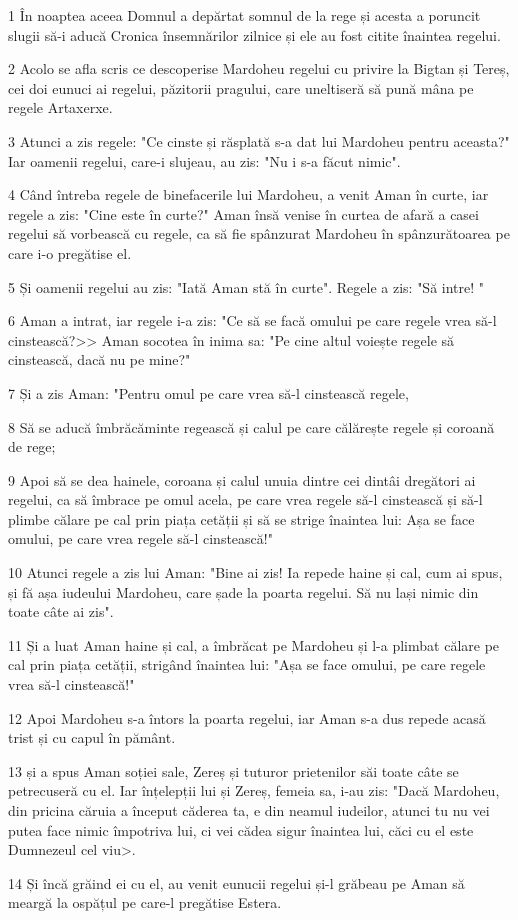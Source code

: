 \par 1 În noaptea aceea Domnul a depărtat somnul de la rege și acesta a poruncit slugii să-i aducă Cronica însemnărilor zilnice și ele au fost citite înaintea regelui.
\par 2 Acolo se afla scris ce descoperise Mardoheu regelui cu privire la Bigtan și Tereș, cei doi eunuci ai regelui, păzitorii pragului, care uneltiseră să pună mâna pe regele Artaxerxe.
\par 3 Atunci a zis regele: "Ce cinste și răsplată s-a dat lui Mardoheu pentru aceasta?" Iar oamenii regelui, care-i slujeau, au zis: "Nu i s-a făcut nimic".
\par 4 Când întreba regele de binefacerile lui Mardoheu, a venit Aman în curte, iar regele a zis: "Cine este în curte?" Aman însă venise în curtea de afară a casei regelui să vorbească cu regele, ca să fie spânzurat Mardoheu în spânzurătoarea pe care i-o pregătise el.
\par 5 Și oamenii regelui au zis: "Iată Aman stă în curte". Regele a zis: "Să intre! "
\par 6 Aman a intrat, iar regele i-a zis: "Ce să se facă omului pe care regele vrea să-l cinstească?>> Aman socotea în inima sa: "Pe cine altul voiește regele să cinstească, dacă nu pe mine?"
\par 7 Și a zis Aman: "Pentru omul pe care vrea să-l cinstească regele,
\par 8 Să se aducă îmbrăcăminte regească și calul pe care călărește regele și coroană de rege;
\par 9 Apoi să se dea hainele, coroana și calul unuia dintre cei dintâi dregători ai regelui, ca să îmbrace pe omul acela, pe care vrea regele să-l cinstească și să-l plimbe călare pe cal prin piața cetății și să se strige înaintea lui: Așa se face omului, pe care vrea regele să-l cinstească!"
\par 10 Atunci regele a zis lui Aman: "Bine ai zis! Ia repede haine și cal, cum ai spus, și fă așa iudeului Mardoheu, care șade la poarta regelui. Să nu lași nimic din toate câte ai zis".
\par 11 Și a luat Aman haine și cal, a îmbrăcat pe Mardoheu și l-a plimbat călare pe cal prin piața cetății, strigând înaintea lui: "Așa se face omului, pe care regele vrea să-l cinstească!"
\par 12 Apoi Mardoheu s-a întors la poarta regelui, iar Aman s-a dus repede acasă trist și cu capul în pământ.
\par 13 și a spus Aman soției sale, Zereș și tuturor prietenilor săi toate câte se petrecuseră cu el. Iar înțelepții lui și Zereș, femeia sa, i-au zis: "Dacă Mardoheu, din pricina căruia a început căderea ta, e din neamul iudeilor, atunci tu nu vei putea face nimic împotriva lui, ci vei cădea sigur înaintea lui, căci cu el este Dumnezeul cel viu>.
\par 14 Și încă grăind ei cu el, au venit eunucii regelui și-l grăbeau pe Aman să meargă la ospățul pe care-l pregătise Estera.

